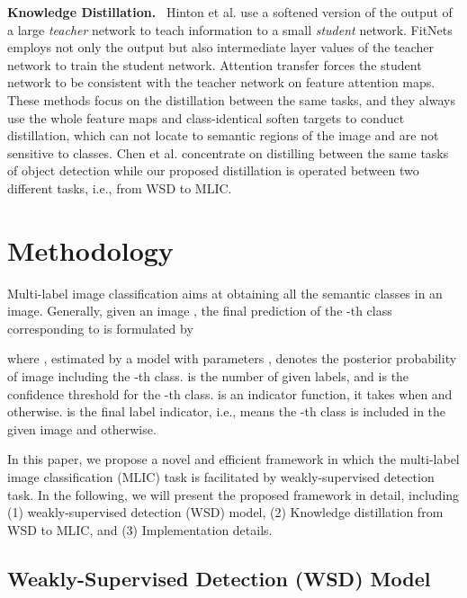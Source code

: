 \documentclass[sigconf,natbib=false]{acmart}
\begin{document}
\noindent \textbf{Knowledge Distillation.} \ Hinton et al. \cite{KD1_nips15_goj} use a softened version of the output of a large \emph{teacher} network to teach information to a small \emph{student} network. FitNets \cite{KD2_iclr15_ansacy} employs not only the output but also intermediate layer values of the teacher network to train the student network. Attention transfer \cite{KD3_iclr17_sn} forces the student network to be consistent with the teacher network on feature attention maps. These methods focus on the distillation between the same tasks, and they always use the whole feature maps and class-identical soften targets to conduct distillation, which can not locate to semantic regions of the image and are not sensitive to classes. Chen et al. \cite{Chen_nips2017_gwxtm} concentrate on distilling between the same tasks of object detection while our proposed distillation is operated between two different tasks, i.e., from WSD to MLIC.



\section{Methodology}
Multi-label image classification aims at obtaining all the semantic classes in an image. Generally, given an image , the final prediction  of the -th class corresponding to  is formulated by

where , estimated by a model with parameters , denotes the posterior probability of image  including the -th class.  is the number of given labels, and  is the confidence threshold for the -th class.  is an indicator function, it takes  when  and  otherwise.  is the final label indicator, i.e.,  means the -th class is included in the given image and  otherwise.

In this paper, we propose a novel and efficient framework in which the multi-label image classification (MLIC) task is facilitated by weakly-supervised detection task. In the following, we will present the proposed framework in detail, including (1) weakly-supervised detection (WSD) model, (2) Knowledge distillation from WSD to MLIC, and (3) Implementation details.


\subsection{Weakly-Supervised Detection (WSD) Model}
\label{Sec:WSD}
\end{document}
